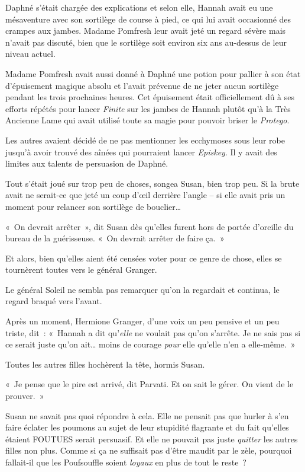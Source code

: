 Daphné s'était chargée des explications et selon elle, Hannah avait eu une mésaventure avec son sortilège de course à pied, ce qui lui avait occasionné des crampes aux jambes. Madame Pomfresh leur avait jeté un regard sévère mais n'avait pas discuté, bien que le sortilège soit environ six ans au-dessus de leur niveau actuel.

Madame Pomfresh avait aussi donné à Daphné une potion pour pallier à son état d'épuisement magique absolu et l'avait prévenue de ne jeter aucun sortilège pendant les trois prochaines heures. Cet épuisement était officiellement dû à ses efforts répétés pour lancer \emph{Finite} sur les jambes de Hannah plutôt qu'à la Très Ancienne Lame qui avait utilisé toute sa magie pour pouvoir briser le \emph{Protego}.

Les autres avaient décidé de ne pas mentionner les ecchymoses sous leur robe jusqu'à avoir trouvé des aînées qui pourraient lancer \emph{Episkey}. Il y avait des limites aux talents de persuasion de Daphné.

Tout s'était joué sur trop peu de choses, songea Susan, bien trop peu. Si la brute avait ne serait-ce que jeté un coup d'œil derrière l'angle -- si elle avait pris un moment pour relancer son sortilège de bouclier…

«~On devrait arrêter~», dit Susan dès qu'elles furent hors de portée d'oreille du bureau de la guérisseuse. «~On devrait arrêter de faire ça.~»

Et alors, bien qu'elles aient été censées voter pour ce genre de chose, elles se tournèrent toutes vers le général Granger.

Le général Soleil ne sembla pas remarquer qu'on la regardait et continua, le regard braqué vers l'avant.

Après un moment, Hermione Granger, d'une voix un peu pensive et un peu triste, dit~: «~Hannah a dit qu'\emph{elle} ne voulait pas qu'on s'arrête. Je ne sais pas si ce serait juste qu'on ait… moins de courage \emph{pour} elle qu'elle n'en a elle-même.~»

Toutes les autres filles hochèrent la tête, hormis Susan.

«~Je pense que le pire est arrivé, dit Parvati. Et on sait le gérer. On vient de le prouver.~»

Susan ne savait pas quoi répondre à cela. Elle ne pensait pas que hurler à s'en faire éclater les poumons au sujet de leur stupidité flagrante et du fait qu'elles étaient FOUTUES serait persuasif. Et elle ne pouvait pas juste \emph{quitter} les autres filles non plus. Comme si ça ne suffisait pas d'être maudit par le zèle, pourquoi fallait-il que les Poufsouffle soient \emph{loyaux} en plus de tout le reste~?

